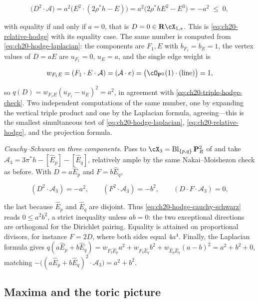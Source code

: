 \begin{example}
\begin{equation}
\label{eq:ch20-triple-hodge-check}
 \bigl(D^2\cdot\mathcal A\bigr)
 =a^2\bigl(E^2\cdot(2\rho^*h-E)\bigr)
 =a^2\bigl(2\rho^*hE^2-E^3\bigr)
 =-a^2\;\leq\;0 ,
\end{equation}

with equality if and only if \(a=0\), that is \(D=0\in\mathbf R\cX_{1,s}\).
This is \eqref{eq:ch20-relative-hodge} with its equality case.  The same
number is computed from \eqref{eq:ch20-hodge-laplacian}: the components are
\(F_1,E\) with \(b_{F_1}=b_E=1\), the vertex values of \(D=aE\) are
\(u_{F_1}=0\), \(u_E=a\), and the single edge weight is

\[
 w_{F_1E}=(F_1\cdot E\cdot\mathcal A)=(\mathcal A\cdot e)
 =\bigl(\cO_{\mathbf P^2}(1)\cdot(\text{line})\bigr)=1 ,
\]

so \(q(D)=w_{F_1E}(u_{F_1}-u_E)^2=a^2\), in agreement with
\eqref{eq:ch20-triple-hodge-check}.  Two independent computations of the
same number, one by expanding the vertical triple product and one by the
Laplacian formula,
agreeing---this is the smallest simultaneous test of
\eqref{eq:ch20-hodge-laplacian}, \eqref{eq:ch20-relative-hodge}, and the
projection formula.

\emph{Cauchy--Schwarz on three components.}  Pass to
\(\cX_3=\operatorname{Bl}_{\{p,q\}}\mathbf P^2_R\) of
 and take
\(\mathcal A_3=3\pi^*h-[\widehat E_p]-[\widehat E_q]\), relatively ample by
the same Nakai--Moishezon check as before.  With
\(D=a\widehat E_p\) and \(F=b\widehat E_q\),

\[
 (D^2\cdot\mathcal A_3)=-a^2,\qquad
 (F^2\cdot\mathcal A_3)=-b^2,\qquad
 (D\cdot F\cdot\mathcal A_3)=0 ,
\]

the last because \(\widehat E_p\) and \(\widehat E_q\) are disjoint.  Thus
\eqref{eq:ch20-hodge-cauchy-schwarz} reads \(0\leq a^2b^2\), a strict
inequality unless \(ab=0\): the two exceptional directions are orthogonal
for the Dirichlet pairing.  Equality is attained on proportional divisors,
for instance \(F=2D\), where both sides equal \(4a^4\).  Finally, the
Laplacian formula gives
\(q(a\widehat E_p+b\widehat E_q)=w_{F_3\widehat E_p}a^2
 +w_{F_3\widehat E_q}b^2+w_{\widehat E_p\widehat E_q}(a-b)^2
 =a^2+b^2+0\), matching
\(-\bigl((a\widehat E_p+b\widehat E_q)^2\cdot\mathcal A_3\bigr)=a^2+b^2\).
\end{example}

\subsection{Maxima and the toric picture}
\label{sec:ch20-ex-max-toric}

